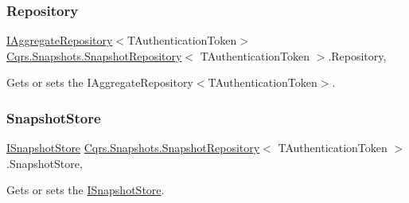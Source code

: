 \subsubsection{\texorpdfstring{Repository}{Repository}}
{\footnotesize\ttfamily \hyperlink{interfaceCqrs_1_1Domain_1_1IAggregateRepository}{I\+Aggregate\+Repository}$<$T\+Authentication\+Token$>$ \hyperlink{classCqrs_1_1Snapshots_1_1SnapshotRepository}{Cqrs.\+Snapshots.\+Snapshot\+Repository}$<$ T\+Authentication\+Token $>$.Repository\hspace{0.3cm}{\ttfamily [get]}, {\ttfamily [protected]}}



Gets or sets the I\+Aggregate\+Repository$<$\+T\+Authentication\+Token$>$. 

\mbox{\label{classCqrs_1_1Snapshots_1_1SnapshotRepository_aba01e9f20eb41e6f3e4476a7f3182275_aba01e9f20eb41e6f3e4476a7f3182275}} 
\subsubsection{\texorpdfstring{Snapshot\+Store}{SnapshotStore}}
{\footnotesize\ttfamily \hyperlink{interfaceCqrs_1_1Snapshots_1_1ISnapshotStore}{I\+Snapshot\+Store} \hyperlink{classCqrs_1_1Snapshots_1_1SnapshotRepository}{Cqrs.\+Snapshots.\+Snapshot\+Repository}$<$ T\+Authentication\+Token $>$.Snapshot\+Store\hspace{0.3cm}{\ttfamily [get]}, {\ttfamily [protected]}}



Gets or sets the \hyperlink{interfaceCqrs_1_1Snapshots_1_1ISnapshotStore}{I\+Snapshot\+Store}. 

\mbox{\label{classCqrs_1_1Snapshots_1_1SnapshotRepository_a7d65b4df10d0b6f75c911a9b6d59b3ba_a7d65b4df10d0b6f75c911a9b6d59b3ba}} 
